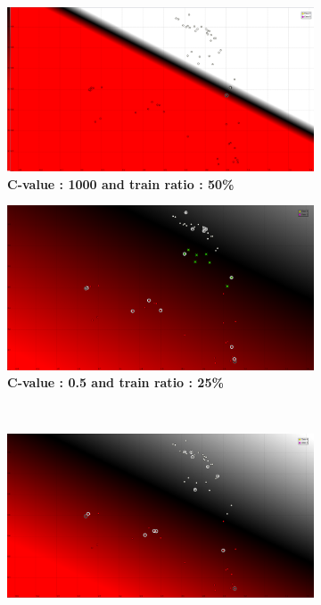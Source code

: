 \begin{figure}[ht]
\centering
\begin{subfigure}[h]{0.31\textwidth}
\includegraphics[height=0.11\textheight]{./classification/SVM_linear_c_1000_TR_50_.png}
\caption{\bf C-value : 1000 and train ratio : 50\%}
\label{fig:SVM_linear_C_value_1000}
\end{subfigure}
\hspace{20mm}
\begin{subfigure}[h]{0.31\textwidth}
\includegraphics[height=0.11\textheight]{./classification/SVM_linear_c_0_5_TR_25_.png}
\caption{\bf C-value : 0.5 and train ratio : 25\%}
\end{subfigure}\\
\begin{subfigure}[h]{0.31\textwidth}
\includegraphics[height=0.11\textheight]{./classification/SVM_linear_c_1_TR_25_.png}

\end{subfigure}
\end{figure}
